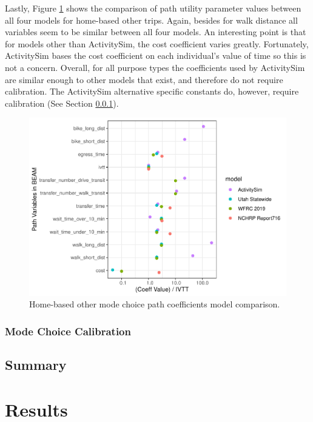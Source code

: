 \documentclass[3p, authoryear, review]{elsarticle} %
\begin{document}
Lastly, Figure \ref{fig:hbo} shows the comparison of path utility parameter values between all four models for home-based other trips. Again, besides for walk distance all variables seem to be similar between all four models. An interesting point is that for models other than ActivitySim, the cost coefficient varies greatly. Fortunately, ActivitySim bases the cost coefficient on each individual's value of time so this is not a concern. Overall, for all purpose types the coefficients used by ActivitySim are similar enough to other models that exist, and therefore do not require calibration. The ActivitySim alternative specific constants do, however, require calibration (See Section \ref{clib}).

\begin{figure}

{\centering \includegraphics{thesis_files/figure-latex/hbo-1} 

}

\caption{Home-based other mode choice path coefficients model comparison.}\label{fig:hbo}
\end{figure}

\hypertarget{clib}{%
\subsubsection{Mode Choice Calibration}\label{clib}}

\hypertarget{summary}{%
\subsection{Summary}\label{summary}}

\hypertarget{results}{%
\section{Results}\label{results}}
\end{document}
